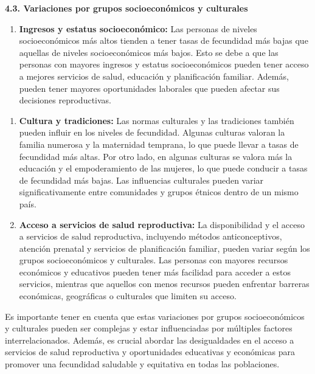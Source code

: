 \documentclass[8pt,a4paper]{beamer}
\begin{document}
{\begin{frame}{}
\begin{block}{\textbf{4.3. Variaciones por grupos socioeconómicos y culturales}}
\begin{enumerate}
\item[\ding{102}] \textbf{Ingresos y estatus socioeconómico:} Las personas de niveles socioeconómicos más altos tienden a tener tasas de fecundidad más bajas que aquellas de niveles socioeconómicos más bajos. Esto se debe a que las personas con mayores ingresos y estatus socioeconómicos pueden tener acceso a mejores servicios de salud, educación y planificación familiar. Además, pueden tener mayores oportunidades laborales que pueden afectar sus decisiones reproductivas.
\end{enumerate}
\end{block}
\end{frame}

\begin{frame}{}
\begin{block}{}
\setlength{\parskip}{3px}
\justifying
\begin{enumerate}
\setlength{\parskip}{3px}
\justifying
\item[\ding{102}] \textbf{Cultura y tradiciones:} Las normas culturales y las tradiciones también pueden influir en los niveles de fecundidad. Algunas culturas valoran la familia numerosa y la maternidad temprana, lo que puede llevar a tasas de fecundidad más altas. Por otro lado, en algunas culturas se valora más la educación y el empoderamiento de las mujeres, lo que puede conducir a tasas de fecundidad más bajas. Las influencias culturales pueden variar significativamente entre comunidades y grupos étnicos dentro de un mismo país.

\item[\ding{102}] \textbf{Acceso a servicios de salud reproductiva:} La disponibilidad y el acceso a servicios de salud reproductiva, incluyendo métodos anticonceptivos, atención prenatal y servicios de planificación familiar, pueden variar según los grupos socioeconómicos y culturales. Las personas con mayores recursos económicos y educativos pueden tener más facilidad para acceder a estos servicios, mientras que aquellos con menos recursos pueden enfrentar barreras económicas, geográficas o culturales que limiten su acceso.
\end{enumerate}
Es importante tener en cuenta que estas variaciones por grupos socioeconómicos y culturales pueden ser complejas y estar influenciadas por múltiples factores interrelacionados. Además, es crucial abordar las desigualdades en el acceso a servicios de salud reproductiva y oportunidades educativas y económicas para promover una fecundidad saludable y equitativa en todas las poblaciones.
\end{block}
\end{frame}


}
\end{document}
